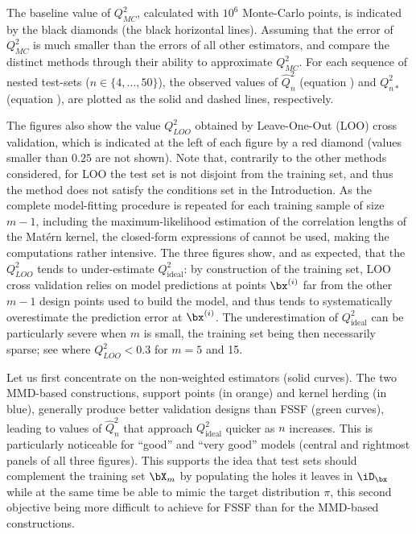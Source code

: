 The baseline value of $Q_{MC}^2$, calculated with $10^6$ Monte-Carlo points, is indicated by the black diamonds (the black horizontal lines).
Assuming that the error of $Q_{MC}^2$ is much smaller than the errors of all other estimators, and compare the distinct methods through their ability to approximate $Q_{MC}^2$. 
For each sequence of nested test-sets ($n\in\{4,\ldots,50\}$), the observed values of $\widehat Q^2_n$ (equation ) and $Q_{n*}^2$ (equation ), are plotted as the solid and dashed lines, respectively. 

The figures also show the value $Q^2_{LOO}$ obtained by Leave-One-Out (LOO) cross validation, which is indicated at the left of each figure by a red diamond (values smaller than $0.25$ are not shown). 
Note that, contrarily to the other methods considered, for LOO the test set is not disjoint from the training set, and thus the method does not satisfy the conditions set in the Introduction. 
As the complete model-fitting procedure is repeated for each training sample of size $m-1$, including the maximum-likelihood estimation of the correlation lengths of the Matérn kernel, the closed-form expressions of \citet{Dubrule83} cannot be used, making the computations rather intensive. 
The three figures show, and as expected, that the $Q_{LOO}^2$ tends to under-estimate $Q_{\mathrm{ideal}}^2$: by construction of the training set, LOO cross validation relies on model predictions at points $\bx^{(i)}$ far from the other $m-1$ design points used to build the model, and thus tends to systematically overestimate the prediction error at $\bx^{(i)}$. 
The underestimation of $Q_{\mathrm{ideal}}^2$ can be particularly severe when $m$ is small, the training set being then necessarily sparse; see  where $Q_{LOO}^2<0.3$ for $m=5$ and 15. 

Let us first concentrate on the non-weighted estimators (solid curves). 
The two MMD-based constructions, support points (in orange) and kernel herding (in blue), generally produce better validation designs than FSSF (green curves), leading to values of $\widehat Q^2_n$ that approach $Q_{\mathrm{ideal}}^2$ quicker as $n$ increases. 
This is particularly noticeable for ``good'' and ``very good'' models (central and rightmost panels of all three figures). 
This supports the idea that test sets should complement the training set $\bX_m$ by populating the holes it leaves in $\iD_\bx$ while at the same time be able to mimic the target distribution $\pi$, this second objective being more difficult to achieve for FSSF than for the MMD-based constructions. 

